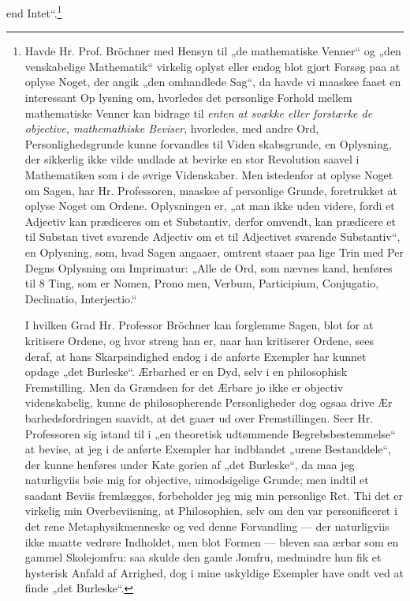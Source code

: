 \documentclass[12pt]{book}
\begin{document}
end Intet“.\footnote{Havde Hr. Prof. Bröchner med Hensyn til „de mathematiske
Venner“ og „den venskabelige Mathematik“ virkelig oplyst eller
endog blot gjort Forsøg paa at oplyse Noget, der angik „den
omhandlede Sag“, da havde vi maaskee faaet en interessant Op\-%
lysning om, hvorledes det personlige Forhold mellem mathematiske
Venner kan bidrage til \emph{enten at svække eller forstærke
de objective, mathemathiske Beviser}, hvorledes, med %
andre Ord, Personlighedsgrunde kunne forvandles til Viden\-%
skabsgrunde, en Oplysning, der sikkerlig ikke vilde undlade
at bevirke en stor Revolution saavel i Mathematiken som
i de øvrige Videnskaber. Men istedenfor at oplyse Noget
om Sagen, har Hr. Professoren, maaskee af personlige
Grunde, foretrukket at oplyse Noget om Ordene. Oplysningen
er, „at man ikke uden videre, fordi et Adjectiv kan prædiceres
om et Substantiv, derfor omvendt, kan prædicere et til Substan\-%
tivet svarende Adjectiv om et til Adjectivet svarende Substantiv“,
en Oplysning, som, hvad Sagen angaaer, omtrent staaer paa lige
Trin med Per Degns Oplysning om Imprimatur: „Alle de Ord,
som nævnes kand, henføres til 8 Ting, som er Nomen, Prono\-%
men, Verbum, Participium, Conjugatio, Declinatio, Interjectio.“

I hvilken Grad Hr. Professor Bröchner kan forglemme
Sagen, blot for at kritisere Ordene, og hvor streng han er,
naar han kritiserer Ordene, sees deraf, at hans Skarpsindighed
endog i de anførte Exempler har kunnet opdage „det Burleske“.
Ærbarhed er en Dyd, selv i en philosophisk Fremstilling. Men
da Grændsen for det Ærbare jo ikke er objectiv videnskabelig,
kunne de philosopherende Personligheder dog ogsaa drive Ær\-%
barhedsfordringen saavidt, at det gaaer ud over Fremstillingen.
Seer Hr. Professoren sig istand til i „en theoretisk udtømmende
Begrebsbestemmelse“ at bevise, at jeg i de anførte Exempler har
indblandet „urene Bestanddele“, der kunne henføres under Kate\-%
gorien af „det Burleske“, da maa jeg naturligviis bøie mig for
objective, uimodsigelige Grunde; men indtil et saadant Beviis
fremlægges, forbeholder jeg mig min personlige Ret. Thi det
er virkelig min Overbeviisning, at Philosophien, selv om den
var personificeret i det rene Metaphysikmenneske og ved denne
Forvandling --- der naturligviis ikke maatte vedrøre Indholdet, men
blot Formen --- bleven saa ærbar som en gammel Skolejomfru:
saa skulde den gamle Jomfru, medmindre hun fik et hysterisk
Anfald af Arrighed, dog i mine uskyldige Exempler have ondt
ved at finde „det Burleske“.}
\end{document}
